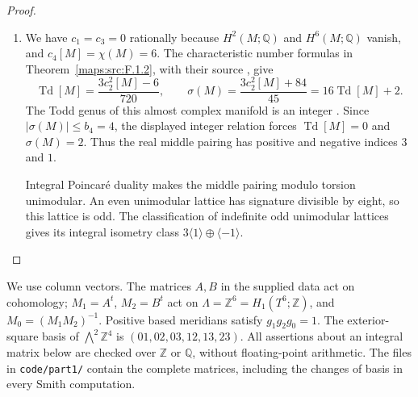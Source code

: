 \begin{proof}
\begin{enumerate}[label=\arabic*.]
Over the two-dimensional pair of pants the prescribed boundary
sections of the associated $\mathcal J$-bundle extend over relative
one-cells by connectedness and over relative two-cells by simple
connectivity. Smooth approximation relative to the collars gives
a smooth vertical structure. Horizontal splittings form an affine
space, so a partition of unity extends the prescribed complex
splittings from those collars. Combining the vertical structure with
the pulled-back base structure and gluing the caps gives the required
almost complex structure on $M$.

\item We have $c_1=c_3=0$ rationally because $H^2(M;\mathbb Q)$ and
$H^6(M;\mathbb Q)$ vanish, and $c_4[M]=\chi(M)=6$. The characteristic
number formulas in Theorem~\ref{maps:src:F.1.2}, with their source
\cite[equations (1.2)--(1.4), pp.~3--4]{ffEsoleKang}, give
\[
 \operatorname{Td}[M]=\frac{3c_2^2[M]-6}{720},
 \qquad
 \sigma(M)=\frac{3c_2^2[M]+84}{45}
           =16\operatorname{Td}[M]+2.
\]
The Todd genus of this almost complex manifold is an integer
\cite[Theorem 24.5.4 and corollary, p.~184]{HirzebruchTopologicalMethods}.
Since $|\sigma(M)|\leq b_4=4$, the displayed integer relation forces
$\operatorname{Td}[M]=0$ and $\sigma(M)=2$. Thus the real middle
pairing has positive and negative indices $3$ and $1$.

Integral Poincar\'e duality makes the middle pairing modulo torsion
unimodular. An even unimodular lattice has signature divisible by
eight, so this lattice is odd. The classification of indefinite odd
unimodular lattices
\cite[Theorem 2.2.1, p.~61]{ffPetersSterk} gives its integral isometry
class $3\langle1\rangle\oplus\langle-1\rangle$.
\end{enumerate}
\end{proof}


\label{sec:fourfold}

We use column vectors.  The matrices $A,B$ in the supplied data act on
cohomology; $M_1=A^t$, $M_2=B^t$ act on
$\Lambda=\mathbb Z^6=H_1(T^6;\mathbb Z)$, and
$M_0=(M_1M_2)^{-1}$.  Positive based meridians satisfy
$g_1g_2g_0=1$.  The exterior-square basis of $\bigwedge^2\mathbb Z^4$
is $(01,02,03,12,13,23)$.  All assertions about an integral matrix below
are checked over $\mathbb Z$ or $\mathbb Q$, without floating-point
arithmetic.  The files in \texttt{code/part1/} contain the complete
matrices, including the changes of basis in every Smith computation.

